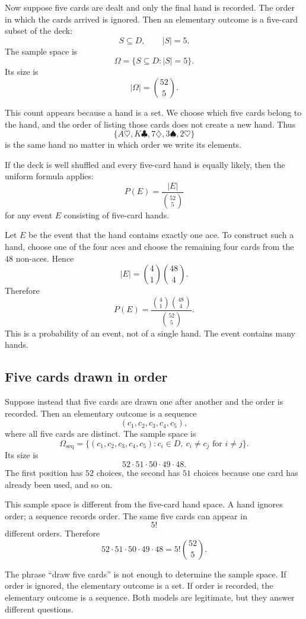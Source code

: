 Now suppose five cards are dealt and only the final hand is recorded. The order
in which the cards arrived is ignored. Then an elementary outcome is a five-card
subset of the deck:
\[
S\subseteq D,\qquad |S|=5.
\]
The sample space is
\[
\Omega=\{S\subseteq D: |S|=5\}.
\]
Its size is
\[
|\Omega|=\binom{52}{5}.
\]

This count appears because a hand is a set. We choose which five cards belong to
the hand, and the order of listing those cards does not create a new hand. Thus
\[
\{A\heartsuit,K\clubsuit,7\diamondsuit,3\spadesuit,2\heartsuit\}
\]
is the same hand no matter in which order we write its elements.

If the deck is well shuffled and every five-card hand is equally likely, then
the uniform formula applies:
\[
P(E)=\frac{|E|}{\binom{52}{5}}
\]
for any event \(E\) consisting of five-card hands.

\begin{examplebox}
Let \(E\) be the event that the hand contains exactly one ace. To construct such
a hand, choose one of the four aces and choose the remaining four cards from the
\(48\) non-aces. Hence
\[
|E|=\binom41\binom{48}{4}.
\]
Therefore
\[
P(E)=\frac{\binom41\binom{48}{4}}{\binom{52}{5}}.
\]
This is a probability of an event, not of a single hand. The event contains many
hands.
\end{examplebox}

\subsection*{Five cards drawn in order}

Suppose instead that five cards are drawn one after another and the order is
recorded. Then an elementary outcome is a sequence
\[
(c_1,c_2,c_3,c_4,c_5),
\]
where all five cards are distinct. The sample space is
\[
\Omega_{\mathrm{seq}}=\{(c_1,c_2,c_3,c_4,c_5): c_i\in D,\ c_i\neq c_j
\text{ for }i\neq j\}.
\]
Its size is
\[
52\cdot 51\cdot 50\cdot 49\cdot 48.
\]
The first position has \(52\) choices, the second has \(51\) choices because one
card has already been used, and so on.

This sample space is different from the five-card hand space. A hand ignores
order; a sequence records order. The same five cards can appear in
\[
5!
\]
different orders. Therefore
\[
52\cdot 51\cdot 50\cdot 49\cdot 48=5!\binom{52}{5}.
\]

\begin{remarkbox}
The phrase ``draw five cards'' is not enough to determine the sample space. If
order is ignored, the elementary outcome is a set. If order is recorded, the
elementary outcome is a sequence. Both models are legitimate, but they answer
different questions.
\end{remarkbox}

